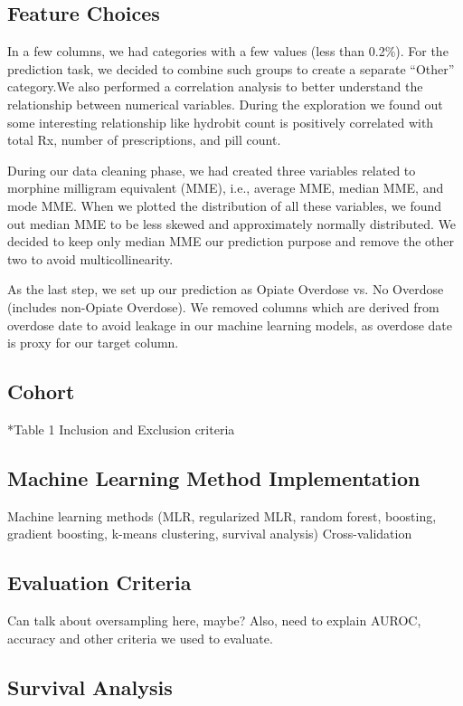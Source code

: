 \documentclass[twoside,10.5pt]{article}
\begin{document}
\subsection{Feature Choices}
In a few columns, we had categories with a few values (less than 0.2\%). For the prediction task, we decided to combine such groups to create a separate “Other” category.We also performed a correlation analysis to better understand the relationship between numerical variables. During the exploration we found out some interesting relationship like hydrobit count is positively correlated with total Rx, number of prescriptions, and pill count.

During our data cleaning phase, we had created three variables related to morphine milligram equivalent (MME), i.e., average MME, median MME, and mode MME.  When we plotted the distribution of all these variables, we found out median MME to be less skewed and approximately normally distributed. We decided to keep only median MME our prediction purpose and remove the other two to avoid multicollinearity.

As the last step, we set up our prediction as Opiate Overdose vs. No Overdose (includes non-Opiate Overdose). We removed columns which are derived from overdose date to avoid leakage in our machine learning models, as overdose date is proxy for our target column.


\subsection{Cohort}
*Table 1
Inclusion and Exclusion criteria 


\subsection{Machine Learning Method Implementation}
Machine learning methods (MLR, regularized MLR, random forest, boosting, gradient boosting, k-means clustering, survival analysis)
Cross-validation

\subsection{Evaluation Criteria}
Can talk about oversampling here, maybe?
Also, need to explain AUROC, accuracy and other criteria we used to evaluate.

\subsection{Survival Analysis}
\end{document}

